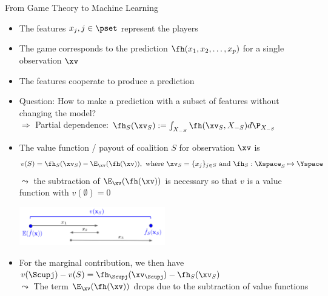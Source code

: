 \documentclass[11pt,compress,t,notes=noshow, aspectratio=169, xcolor=table]{beamer}
\begin{document}
\begin{frame}{From Game Theory to Machine Learning}
\begin{itemize}[<+->]
    \item The features $x_j, j \in \pset$ represent the players
    \item The game corresponds to the prediction $\fh(x_1, x_2, \ldots, x_p)$ for a single observation $\xv$
    \item The features cooperate to produce a prediction
    \item Question: How to make a prediction with a subset of features without changing the model?
    \\ $\Rightarrow$ Partial dependence: $\fh_{S}(\xv_S) := \int_{X_{-S}} \fh(\xv_S, X_{-S})d \P_{X_{-S}}$
    \item  The value function / payout of coalition $S$ for observation $\xv$ is
    $$v(S) =  \fh_{S} (\xv_S) - \E_{\xv}(\fh(\xv)), \text{ where } \xv_S = \{x_j\}_{j \in S} \text{ and } \fh_S: \Xspace_S \mapsto \Yspace$$
    $\leadsto$ the subtraction of $\E_{\xv}(\fh(\xv))$ is necessary so that $v$ is a value function with $v(\emptyset) = 0$
    \centerline{\includegraphics[width=0.5\textwidth, trim=20 0 0 100, clip]{figure_man/shapley_valuefct}}
    \item For the marginal contribution, we then have $v(\Scupj) - v(S) =  \fh_{\Scupj} (\xv_{\Scupj}) - \fh_{S} (\xv_{S})$\\
    $\leadsto$ The term $\E_{\xv}(\fh(\xv))$ drops due to the subtraction of value functions
\end{itemize}
\end{frame}
\end{document}
